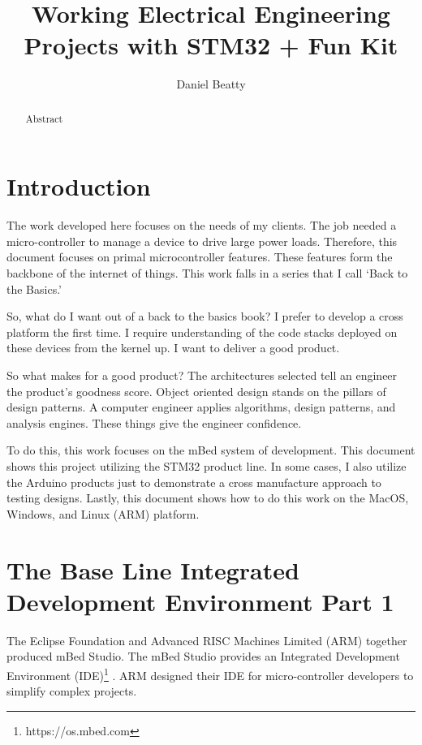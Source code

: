 \documentclass{article}
\title{Working Electrical Engineering Projects with STM32 + Fun Kit}
\author{Daniel Beatty}
\begin{document}
\maketitle

\begin{abstract}
    Abstract
\end{abstract}

\section{Introduction}

The work developed here focuses on the needs of my clients.  The job needed a micro-controller to manage a device to drive large power loads.  Therefore, this document focuses on primal microcontroller features.  These features form the backbone of the internet of things. This work falls in a series that I call ‘Back to the Basics.’ 

So, what do I want out of a back to the basics book? I prefer to develop a cross platform the first time. I require understanding of the code stacks deployed on these devices from the kernel up.  I want to deliver a good product.

So what makes for a good product?  The architectures selected tell an engineer the product's goodness score.  Object oriented design stands on the pillars of design patterns.  A computer engineer applies algorithms, design patterns, and analysis engines.  These things give the engineer confidence.

To do this, this work focuses on the mBed system of development. This document shows this project utilizing the STM32 product line. In some cases, I also utilize the Arduino products just to demonstrate a cross manufacture approach to testing designs. Lastly, this document shows how to do this work on the MacOS, Windows, and Linux (ARM) platform. 


\newpage
\section{The Base Line Integrated Development Environment Part 1} %
\label{sec:the_base_line_integrated_development_environment_part_1}
The Eclipse Foundation and Advanced RISC Machines Limited (ARM) together produced mBed Studio.  The mBed Studio provides an Integrated Development Environment (IDE)\footnote{https://os.mbed.com} .  ARM designed their IDE for micro-controller developers to simplify complex projects. 
\end{document}
